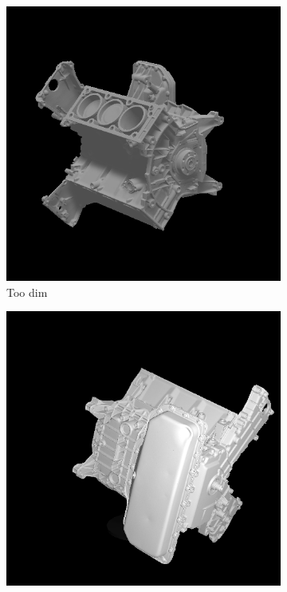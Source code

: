 \begin{figure}[H]
	\centering
	\begin{subfigure}[b]{0.32\linewidth}
		\includegraphics[width=\textwidth]{./Figures/wrong_exposure_2.png}
		\caption{Too dim}
	\end{subfigure}
	\begin{subfigure}[b]{0.32\linewidth}
		\includegraphics[width=\textwidth]{./Figures/right_exposure.png}

\end{subfigure}
\end{figure}
